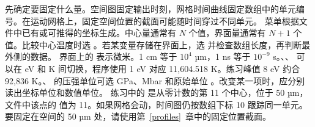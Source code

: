 先确定要固定什么量。空间图固定输出时刻，网格时间曲线固定数组中的单元编号。在运动网格上，固定空间位置的截面可能随时间穿过不同单元。
菜单根据文件中已有或可推得的坐标生成。中心量通常有 \(N\) 个值，界面量通常有 \(N+1\) 个值。比较中心温度时选 。若某变量存储在界面上，选  并检查数组长度，再判断最外侧的数据。
界面上的  表示微米。1 cm 等于 \(10^4\) µm，1 ns 等于 \(10^{-9}\) s。、、 可以在 eV 和 K 间切换，程序使用 1 eV 对应 11,604.518 K。练习峰值 8 eV 约合 92,836 K。、 的压强单位可选 GPa、Mbar 和原始单位 。改变某一项时，应分别读出坐标单位和数值单位。
练习中的  是从零计数的第 11 个中心，位于 50 µm，文件中该点的  值为 11。如果网格会动，时间图仍按数组下标 10 跟踪同一单元。要固定在空间的 50 µm 处，请使用第~\ref{profiles}~章中的固定位置截面。
